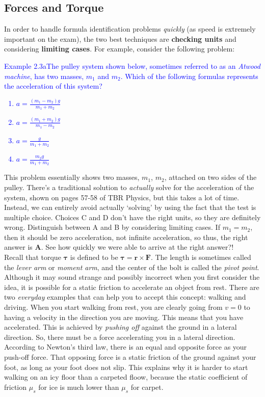 \documentclass{article}
\theoremstyle{plain}%
\theoremstyle{definition}
\theoremstyle{remark}
\begin{document}
\subsection{Forces and Torque}
\indent In order to handle formula identification problems \textit{quickly} (as speed is extremely important on the exam), the two best techniques are \textbf{checking units} and considering \textbf{limiting cases}. For example, consider the following problem:
\begin{center}
\begin{minipage}{30em}
\textcolor{blue}{Example 2.3a\quad The pulley system shown below, sometimes referred to as an \textit{Atwood machine}, has two masses, $m_1$ and $m_2$. Which of the following formulas represents the acceleration of this system?
\begin{enumerate}[label=\Alph*]
	\item $a=\frac{\left(m_1-m_2\right)g}{m_1+m_2}$
	\item $a=\frac{\left(m_1+m_2\right)g}{m_1-m_2}$
	\item $a=\frac{g}{m_1+m_2}$
	\item $a=\frac{m_2g}{m_1+m_2}$
\end{enumerate}}
\end{minipage}
\end{center}
\noindent This problem essentially shows two masses, $m_1$, $m_2$, attached on two sides of the pulley. There's a traditional solution to \textit{actually} solve for the acceleration of the system, shown on pages 57-58 of TBR Physics, but this takes a lot of time. Instead, we can entirely avoid actually `solving' by using the fact that the test is multiple choice. Choices C and D don't have the right units, so they are definitely wrong. Distinguish between A and B by considering limiting cases. If $m_1=m_2$, then it should be zero acceleration, not infinite acceleration, so thus, the right answer is \textbf{A}. See how quickly we were able to arrive at the right answer?!\\
\indent Recall that torque $\mathbf{\tau}$ is defined to be $\mathbf{\tau}=\mathbf{r}\times\mathbf{F}$. The length is sometimes called the \textit{lever arm} or \textit{moment arm}, and the center of the bolt is called the \textit{pivot point}. \\
\indent Although it may sound strange and possibly incorrect when you first consider the idea, it is possible for a static friction to accelerate an object from rest. There are two \textit{everyday} examples that can help you to accept this concept: walking and driving. When you start walking from rest, you are clearly going from $v=0$ to having a velocity in the direction you are moving. This means that you have accelerated. This is achieved by \textit{pushing off} against the ground in a lateral direction. So, there must be a force accelerating you in a lateral direction. According to Newton's third law, there is an equal and opposite force as your push-off force. That opposing force is a static friction of the ground against your foot, as long as your foot does not slip. This explains why it is harder to start walking on an icy floor than a carpeted floow, because the static coefficient of friction $\mu_s$ for ice is much lower than $\mu_s$ for carpet. \\
\end{document}
